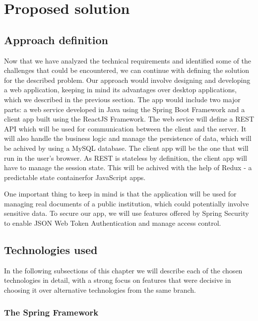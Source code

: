 \chapter{Proposed solution}
\label{chapter:proposedSolution}

\section{Approach definition}
\label{section:approachDefinition}

Now that we have analyzed the technical requirements and identified some of the challenges that could be encountered, we can continue with defining the solution for the described problem. Our approach would involve designing and developing a web application, keeping in mind its advantages over desktop applications, which we described in the previous section. The app would include two major parts: a web service developed in Java using the Spring Boot Framework and a client app built using the ReactJS Framework. The web sevice will define a REST API which will be used for communication between the client and the server. It will also handle the business logic and manage the persistence of data, which will be achived by using a MySQL database. The client app will be the one that will run in the user's browser. As REST is stateless by definition, the client app will have to manage the session state. This will be achived with the help of Redux - a predictable state containerfor JavaScript apps.

One important thing to keep in mind is that the application will be used for managing real documents of a public institution, which could potentially involve sensitive data. To secure our app, we will use features offered by Spring Security to enable JSON Web Token Authentication and manage access control.


\section{Technologies used}
\label{section:technologiesUsed}

In the following subsections of this chapter we will describe each of the chosen technologies in detail, with a strong focus on features that were decisive in choosing it over alternative technologies from the same branch.


\subsection{The Spring Framework}
\label{subsection:springBootFramework}



